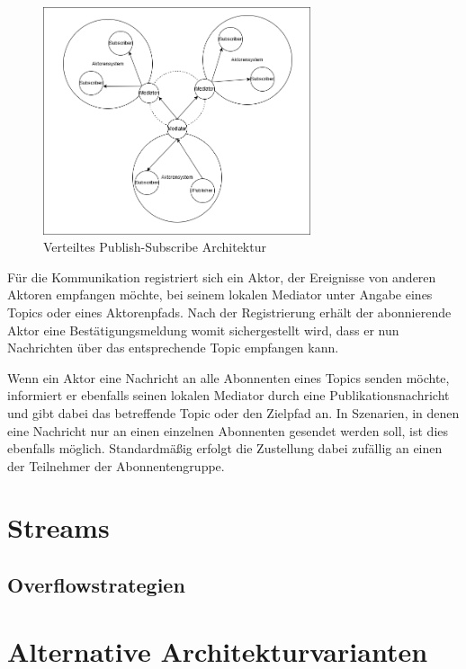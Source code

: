 \begin{figure}[H]
    \centering
    \includegraphics[width=0.7\textwidth]{assets/dis-p_s.png}
    \caption{Verteiltes Publish-Subscribe Architektur \parencite{distributed_petabridge}}
    \label{fig:distribute-pub-sub}
\end{figure}

Für die Kommunikation registriert sich ein Aktor, der Ereignisse von anderen Aktoren empfangen möchte, bei seinem 
lokalen Mediator unter Angabe eines Topics oder eines Aktorenpfads. Nach der Registrierung erhält der abonnierende 
Aktor eine Bestätigungsmeldung womit sichergestellt wird, dass er nun Nachrichten über das entsprechende Topic 
empfangen kann.

Wenn ein Aktor eine Nachricht an alle Abonnenten eines Topics senden möchte, informiert er ebenfalls seinen lokalen 
Mediator durch eine Publikationsnachricht und gibt dabei das betreffende Topic oder den Zielpfad an. In Szenarien, 
in denen eine Nachricht nur an einen einzelnen Abonnenten gesendet werden soll, ist dies ebenfalls möglich. 
Standardmäßig erfolgt die Zustellung dabei zufällig an einen der Teilnehmer der Abonnentengruppe.
\parencite{distributed_petabridge}

\section{Streams}



\subsection{Overflowstrategien}


\section{Alternative Architekturvarianten}

